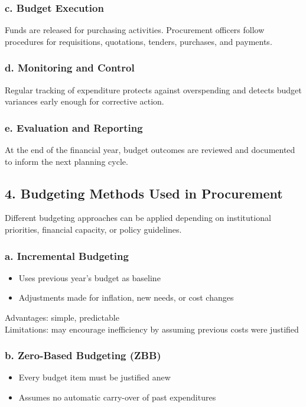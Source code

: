\documentclass[10pt]{article}
\begin{document}
\subsubsection*{c. Budget Execution}
Funds are released for purchasing activities. Procurement officers follow procedures for requisitions, quotations, tenders, purchases, and payments.

\subsubsection*{d. Monitoring and Control}
Regular tracking of expenditure protects against overspending and detects budget variances early enough for corrective action.

\subsubsection*{e. Evaluation and Reporting}
At the end of the financial year, budget outcomes are reviewed and documented to inform the next planning cycle.

\subsection*{4. Budgeting Methods Used in Procurement}
Different budgeting approaches can be applied depending on institutional priorities, financial capacity, or policy guidelines.

\subsubsection*{a. Incremental Budgeting}
\begin{itemize}
  \item Uses previous year's budget as baseline
  \item Adjustments made for inflation, new needs, or cost changes
\end{itemize}

Advantages: simple, predictable\\
Limitations: may encourage inefficiency by assuming previous costs were justified

\subsubsection*{b. Zero-Based Budgeting (ZBB)}
\begin{itemize}
  \item Every budget item must be justified anew
  \item Assumes no automatic carry-over of past expenditures
\end{itemize}
\end{document}
